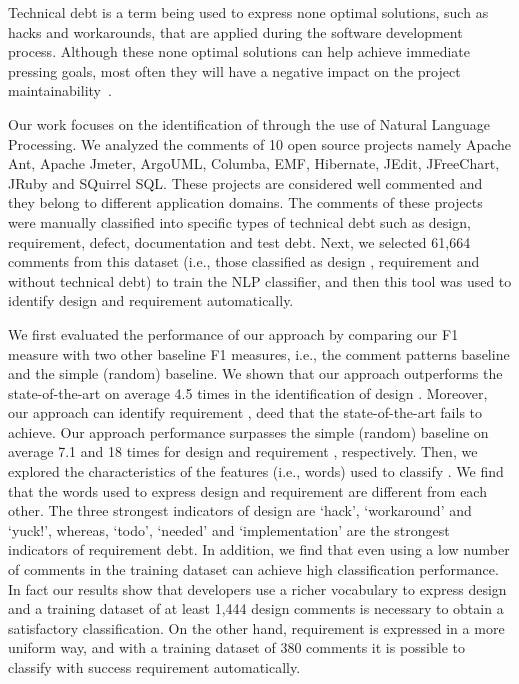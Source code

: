 Technical debt is a term being used to express none optimal solutions, such as hacks and workarounds, that are applied during the software development process. Although these none optimal solutions can help achieve immediate pressing goals, most often they will have a negative impact on the project maintainability~\cite{Zazworka2011MTD}. 

Our work focuses on the identification of \SATD through the use of Natural Language Processing. We analyzed the comments of 10 open source projects namely Apache Ant, Apache Jmeter, ArgoUML, Columba, EMF, Hibernate, JEdit, JFreeChart, JRuby and SQuirrel SQL. These projects are considered well commented and they belong to different application domains. The comments of these projects were manually classified into specific types of technical debt such as design, requirement, defect, documentation and test debt. Next, we selected 61,664 comments from this dataset (i.e., those classified as design \SATD, requirement \SATD and without technical debt) to train the NLP classifier, and then this tool was used to identify  design and requirement \SATD automatically.

We first evaluated the performance of our approach by comparing our F1 measure with two other baseline F1 measures, i.e., the comment patterns baseline and the simple (random) baseline. We shown that our approach outperforms the state-of-the-art on average 4.5 times in the identification of design \SATD. Moreover, our approach can identify requirement \SATD, deed that the state-of-the-art fails to achieve. Our approach performance surpasses the simple (random) baseline on average 7.1 and 18 times for design and requirement \SATD, respectively. Then, we explored the characteristics of the features (i.e., words) used to classify \SATD. We find that the words used to express design and requirement \SATD are different from each other. The three strongest indicators of design \SATD are `hack', `workaround' and `yuck!', whereas, `todo', `needed' and `implementation' are the strongest indicators of requirement debt. In addition, we find that even using a low number of \SATD comments in the training dataset can achieve high classification performance. In fact our results show that developers use a richer vocabulary to express design \SATD and a training dataset of at least 1,444 design \SATD comments is necessary to obtain a satisfactory classification. On the other hand, requirement \SATD is expressed in a more uniform way, and with a training dataset of 380 \SATD comments it is possible to classify with success requirement \SATD automatically.

